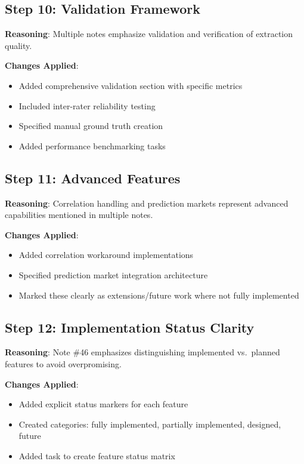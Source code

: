 \documentclass[
  11pt,
  letterpaper,
]{book}
\providecommand{\tightlist}{%
  \setlength{\itemsep}{0pt}\setlength{\parskip}{0pt}}
\begin{document}
\subsection{Step 10: Validation
Framework}\label{step-10-validation-framework}

\textbf{Reasoning}: Multiple notes emphasize validation and verification
of extraction quality.

\textbf{Changes Applied}:

\begin{itemize}
\tightlist
\item
  Added comprehensive validation section with specific metrics
\item
  Included inter-rater reliability testing
\item
  Specified manual ground truth creation
\item
  Added performance benchmarking tasks
\end{itemize}

\subsection{Step 11: Advanced Features}\label{step-11-advanced-features}

\textbf{Reasoning}: Correlation handling and prediction markets
represent advanced capabilities mentioned in multiple notes.

\textbf{Changes Applied}:

\begin{itemize}
\tightlist
\item
  Added correlation workaround implementations
\item
  Specified prediction market integration architecture
\item
  Marked these clearly as extensions/future work where not fully
  implemented
\end{itemize}

\subsection{Step 12: Implementation Status
Clarity}\label{step-12-implementation-status-clarity}

\textbf{Reasoning}: Note \#46 emphasizes distinguishing implemented
vs.~planned features to avoid overpromising.

\textbf{Changes Applied}:

\begin{itemize}
\tightlist
\item
  Added explicit status markers for each feature
\item
  Created categories: fully implemented, partially implemented,
  designed, future
\item
  Added task to create feature status matrix
\end{itemize}
\end{document}
